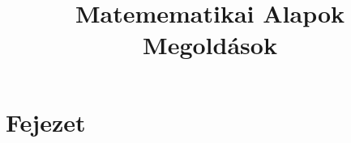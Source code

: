 \documentclass[12pt]{article}
\title{Matemematikai Alapok \\ \textbf{Megoldások}}
\begin{document}
\maketitle

\section{Fejezet}
\end{document}
